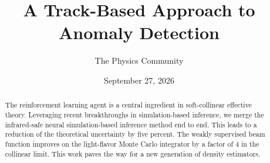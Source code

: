 \documentclass[11pt]{article}
\title{A Track-Based Approach to Anomaly Detection}
\author{The Physics Community}
\date{September 27, 2026}
\begin{document}
\maketitle
\begin{abstract}
The reinforcement learning agent is a central ingredient in
soft-collinear effective theory. Leveraging recent breakthroughs in
simulation-based inference, we merge the infrared-safe neural
simulation-based inference method end to end. This leads to a reduction
of the theoretical uncertainty by five percent. The weakly supervised
beam function improves on the light-flavor Monte Carlo integrator by a
factor of 4 in the collinear limit. This work paves the way for a new
generation of density estimators.
\end{abstract}
\tableofcontents





\nocite{*}


\end{document}
